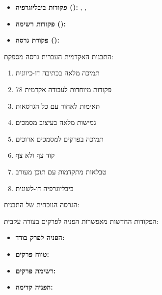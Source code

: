 \documentclass{hebrew-academic-template}
\begin{document}
\begin{itemize}
    \item \textbf{פקודות ביבליוגרפיה ():} , , 

    \item \textbf{פקודות רשימה ():} 

    \item \textbf{פקודת גרסה ():} 
\end{itemize}


התבנית האקדמית העברית גרסה \en{\clsversion} מספקת:

\begin{enumerate}
    \item תמיכה מלאה בכתיבה דו-כיוונית
    \item \num{78} פקודות מיוחדות לעבודה אקדמית
    \item תאימות לאחור עם כל הגרסאות
    \item גמישות מלאה בעיצוב מסמכים
    \item תמיכה בפרקים למסמכים ארוכים
    \item קוד צף ולא צף
    \item טבלאות מתקדמות עם תוכן מעורב
    \item ביבליוגרפיה דו-לשונית
\end{enumerate}

הגרסה הנוכחית של התבנית: \en{\clsversion}


הפקודות החדשות מאפשרות הפניה לפרקים בצורה עקבית:

\begin{itemize}
    \item \textbf{הפניה לפרק בודד:}  %
    \item \textbf{טווח פרקים:}  %
    \item \textbf{רשימת פרקים:}  %
    \item \textbf{הפניה קדימה:}  %
\end{itemize}
\end{document}
